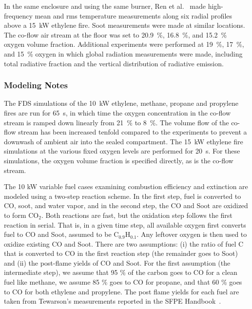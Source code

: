 In the same enclosure and using the same burner, Ren et al.~\cite{Ren:IAFSS2020} made high-frequency mean and rms temperature measurements along six radial profiles above a 15~kW ethylene fire. Soot measurements were made at similar locations. The co-flow air stream at the floor was set to 20.9~\%, 16.8~\%, and 15.2~\% oxygen volume fraction. Additional experiments were performed at 19~\%, 17~\%, and 15~\% oxygen in which global radiation measurements were made, including total radiative fraction and the vertical distribution of radiative emission.

\subsubsection{Modeling Notes}

The FDS simulations of the 10~kW ethylene, methane, propane and propylene fires are run for 65~s, in which time the oxygen concentration in the co-flow stream is ramped down linearly from 21~\% to 8~\%. The volume flow of the co-flow stream has been increased tenfold compared to the experiments to prevent a downwash of ambient air into the sealed compartment. The 15~kW ethylene fire simulations at the various fixed oxygen levels are performed for 20~s. For these simulations, the oxygen volume fraction is specified directly, as is the co-flow stream.

The 10 kW variable fuel cases examining combustion efficiency and extinction are modeled using a two-step reaction scheme. In the first step, fuel is converted to CO, soot, and water vapor, and in the second step, the CO and Soot are oxidized to form CO$_2$. Both reactions are fast, but the oxidation step follows the first reaction in serial. That is, in a given time step, all available oxygen first converts fuel to CO and Soot, assumed to be C$_{0.9}$H$_{0.1}$. Any leftover oxygen is then used to oxidize existing CO and Soot. There are two assumptions: (i) the ratio of fuel C that is converted to CO in the first reaction step (the remainder goes to Soot) and (ii) the post-flame yields of CO and Soot.  For the first assumption (the intermediate step), we assume that 95 \% of the carbon goes to CO for a clean fuel like methane, we assume 85 \% goes to CO for propane, and that 60 \% goes to CO for both ethylene and propylene.  The post flame yields for each fuel are taken from Tewarson's measurements reported in the SFPE Handbook~\cite{SFPE:Tewarson}.

